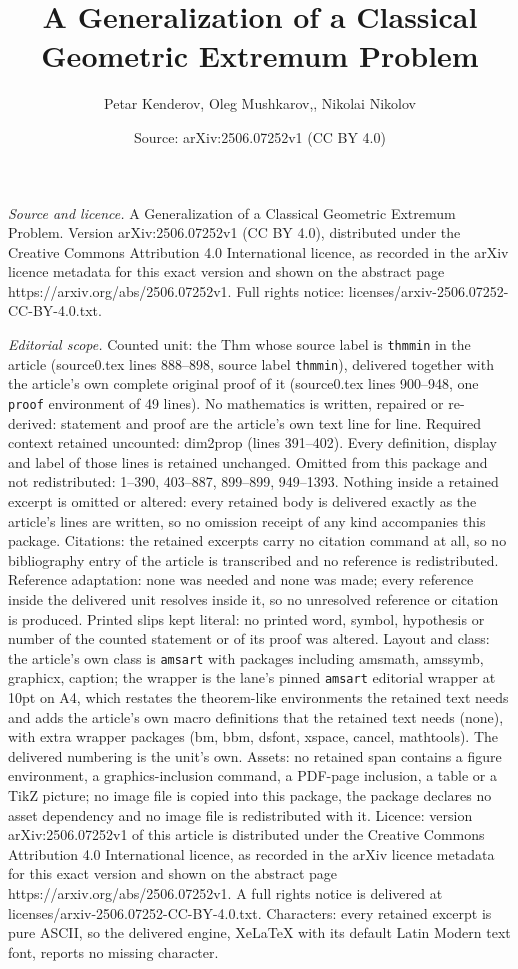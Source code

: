\documentclass[10pt,a4paper]{amsart}
\title[A Generalization of a Classical Geometric Extremum Problem]{A Generalization of a Classical Geometric Extremum Problem}
\author{Petar Kenderov, Oleg Mushkarov,, Nikolai Nikolov}
\date{Source: arXiv:2506.07252v1 (CC BY 4.0)}
\begin{document}
\maketitle

\noindent\emph{Source and licence.} A Generalization of a Classical Geometric Extremum Problem. Version arXiv:2506.07252v1 (CC BY 4.0), distributed under the Creative Commons Attribution 4.0 International licence, as recorded in the arXiv licence metadata for this exact version and shown on the abstract page https://arxiv.org/abs/2506.07252v1. Full rights notice: licenses/arxiv-2506.07252-CC-BY-4.0.txt.\par\smallskip

\noindent\textit{Editorial scope.} Counted unit: the Thm whose source label is \texttt{thmmin} in the article (source0.tex lines 888--898, source label \texttt{thmmin}), delivered together with the article's own complete original proof of it (source0.tex lines 900--948, one \texttt{proof} environment of 49 lines). No mathematics is written, repaired or re-derived: statement and proof are the article's own text line for line. Required context retained uncounted: dim2prop (lines 391--402). Every definition, display and label of those lines is retained unchanged. Omitted from this package and not redistributed: 1--390, 403--887, 899--899, 949--1393. Nothing inside a retained excerpt is omitted or altered: every retained body is delivered exactly as the article's lines are written, so no omission receipt of any kind accompanies this package. Citations: the retained excerpts carry no citation command at all, so no bibliography entry of the article is transcribed and no reference is redistributed. Reference adaptation: none was needed and none was made; every reference inside the delivered unit resolves inside it, so no unresolved reference or citation is produced. Printed slips kept literal: no printed word, symbol, hypothesis or number of the counted statement or of its proof was altered. Layout and class: the article's own class is \texttt{amsart} with packages including amsmath, amssymb, graphicx, caption; the wrapper is the lane's pinned \texttt{amsart} editorial wrapper at 10pt on A4, which restates the theorem-like environments the retained text needs and adds the article's own macro definitions that the retained text needs (none), with extra wrapper packages (bm, bbm, dsfont, xspace, cancel, mathtools). The delivered numbering is the unit's own. Assets: no retained span contains a figure environment, a graphics-inclusion command, a PDF-page inclusion, a table or a TikZ picture; no image file is copied into this package, the package declares no asset dependency and no image file is redistributed with it. Licence: version arXiv:2506.07252v1 of this article is distributed under the Creative Commons Attribution 4.0 International licence, as recorded in the arXiv licence metadata for this exact version and shown on the abstract page https://arxiv.org/abs/2506.07252v1. A full rights notice is delivered at licenses/arxiv-2506.07252-CC-BY-4.0.txt. Characters: every retained excerpt is pure ASCII, so the delivered engine, XeLaTeX with its default Latin Modern text font, reports no missing character.
\end{document}
